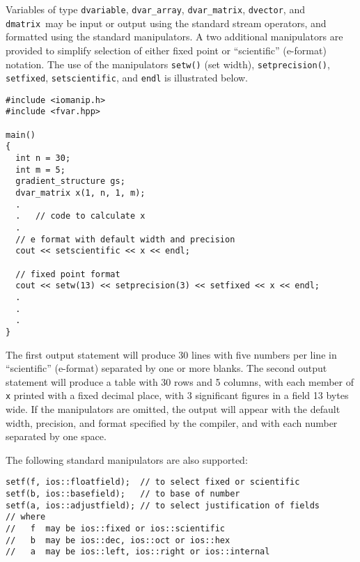 \documentclass{admbmanual}
\newcommand\adtypes{\texttt{dvariable}, \texttt{dvar\_array},
  \texttt{dvar\_matrix}, \texttt{dvector}, and \texttt{dmatrix}}
\begin{document}
Variables of type \adtypes\ may be input or output using the standard stream
operators, and formatted using the standard manipulators. A two additional
manipulators are provided to simplify selection of either fixed point or
``scientific'' (e-format) notation. The use of the manipulators \texttt{setw()}
(set width), \texttt{setprecision()}, \texttt{setfixed}, \texttt{setscientific},
and \texttt{endl} is illustrated below.
\begin{lstlisting}
#include <iomanip.h>
#include <fvar.hpp>

main()
{
  int n = 30;
  int m = 5;
  gradient_structure gs;
  dvar_matrix x(1, n, 1, m);
  .
  .   // code to calculate x
  .
  // e format with default width and precision
  cout << setscientific << x << endl;

  // fixed point format
  cout << setw(13) << setprecision(3) << setfixed << x << endl;
  .
  .
  .
}
\end{lstlisting}
The first output statement will produce 30 lines with five numbers per line in
``scientific'' (e-format) separated by one or more blanks. The second output
statement will produce a table with 30 rows and 5 columns, with each member of
\texttt{x} printed with a fixed decimal place, with 3 significant figures in a
field 13 bytes wide. If the manipulators are omitted, the output will appear
with the default width, precision, and format specified by the compiler, and
with each number separated by one space.

The following standard manipulators are also supported:
\begin{lstlisting}
setf(f, ios::floatfield);  // to select fixed or scientific
setf(b, ios::basefield);   // to base of number
setf(a, ios::adjustfield); // to select justification of fields
// where
//   f  may be ios::fixed or ios::scientific
//   b  may be ios::dec, ios::oct or ios::hex
//   a  may be ios::left, ios::right or ios::internal
\end{lstlisting}

\end{document}

